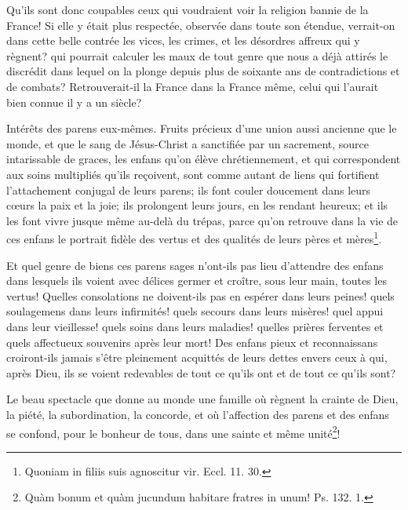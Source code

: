 \documentclass[instructions.tex]{subfiles}
\begin{document}
Qu'ils sont donc coupables ceux qui voudraient voir la religion bannie de la France! Si elle y était plus respectée, observée dans toute son étendue, verrait-on dans cette belle contrée les vices, les crimes, et les désordres affreux qui y règnent? qui pourrait calculer les maux de tout genre que nous a déjà attirés le discrédit dans lequel on la plonge depuis plus de soixante ans de contradictions et de combats? Retrouverait-il la France dans la France même, celui qui l'aurait bien connue il y a un siècle?
 
\quarto Intérêts des parens eux-mêmes. Fruits précieux d'une union aussi ancienne que le monde, et que le sang de Jésus-Christ a sanctifiée par un sacrement, source intarissable de graces, les enfans qu'on élève chrétiennement, et qui correspondent aux soins multipliés qu'ils reçoivent, sont comme autant de liens qui fortifient l'attachement conjugal de leurs parens; ils font couler doucement dans leurs cœurs la paix et la joie; ils prolongent leurs jours, en les rendant heureux; et ils les font vivre jusque même au-delà du trépas, parce qu'on retrouve dans la vie de ces enfans le portrait fidèle des vertus et des qualités de leurs pères et mères\footnote{Quoniam in filiis suis agnoscitur vir. Eccl. 11. 30.}.
 
Et quel genre de biens ces parens sages n'ont-ils pas lieu d'attendre des enfans dans lesquels ils voient avec délices germer et croître, sous leur main, toutes les vertus! Quelles consolations ne doivent-ils pas en espérer dans leurs peines! quels soulagemens dans leurs infirmités! quels secours dans leurs misères! quel appui dans leur vieillesse! quels soins dans leurs maladies! quelles prières ferventes et quels affectueux souvenirs après leur mort! Des enfans pieux et reconnaissans croiront-ils jamais s'être pleinement acquittés de leurs dettes envers ceux à qui, après Dieu, ils se voient redevables de tout ce qu'ils ont et de tout ce qu'ils sont?
 
Le beau spectacle que donne au monde une famille où règnent la crainte de Dieu, la piété, la subordination, la concorde, et où l'affection des parens et des enfans se confond, pour le bonheur de tous, dans une sainte et même unité\footnote{Quàm bonum et quàm jucundum habitare fratres in unum! Ps. 132. 1.}!
 
\end{document}
